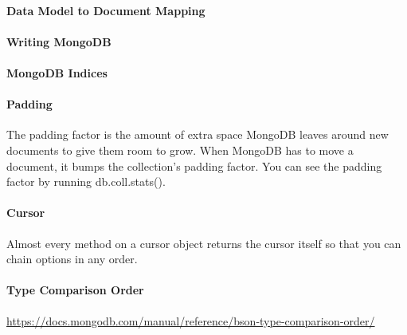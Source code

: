 \paragraph{Data Model to Document Mapping}

\paragraph{Writing MongoDB}

\paragraph{MongoDB Indices}

\paragraph{Padding}
The padding factor is the amount of extra space MongoDB leaves around new documents to give them room to grow. When MongoDB has to move a document, it bumps the collection’s padding factor. You can see the padding factor by running db.coll.stats().

\paragraph{Cursor}
Almost every method on a cursor object returns the cursor itself so that you can chain options in any order. %

\paragraph{Type Comparison Order}
\url{https://docs.mongodb.com/manual/reference/bson-type-comparison-order/}



